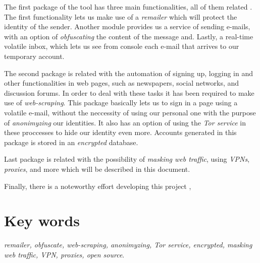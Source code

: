 The first package of the tool has three main functionalities, all of
them related . The first
functionality lets us make use of a \textit{remailer} which will
protect the identity of the sender. Another module provides us a
service of sending e-mails, with an option of \textit{obfuscating} the
content of the message and. Lastly, a real-time volatile inbox, which
lets us see from console each e-mail that arrives to our temporary
account.

The second package is related with the automation of signing up,
logging in and other functionalities in web pages, such as newspapers,
social networks, and discussion forums. In order to deal with these
tasks it has been required to make use of \textit{web-scraping}. This
package basically lets us to sign in a page using a volatile e-mail,
without the neccessity of using our personal one with the purpose of
\textit{anonimyzing} our identities. It also has an option of using
the \textit{Tor service} in these proccesses to hide our identity even
more. Accounts generated in this package is stored in an
\textit{encrypted} database.

Last package is related with the possibility of \textit{masking web
  traffic}, using \textit{VPNs}, \textit{proxies}, and more
  which will be described in this document.

Finally, there is a noteworthy effort  developing this
project ,


\section*{Key words}
\textit{remailer, obfuscate, web-scraping, anonimyzing, Tor service, encrypted, masking web traffic, VPN, proxies, open source}.

